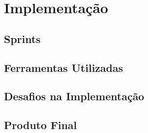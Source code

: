 \chapter{Implementação}
\label{sec:implementacao}


\section{Sprints}
\label{sec:sprints}

\section{Ferramentas Utilizadas}
\label{sec:ferramentas}

\section{Desafios na Implementação}
\label{sec:dificuldades}

\section{Produto Final}
\label{sec:finalPro}

\blankpage

\glsresetall
